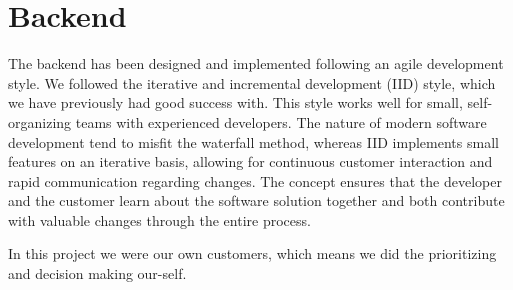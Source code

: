 \chapter{Backend}
\label{chap:backend}

The backend has been designed and implemented following an agile development style. We followed the iterative and incremental development (IID) style, which we have previously had good success with. This style works well for small, self-organizing teams with experienced developers. The nature of modern software development tend to misfit the waterfall method, whereas IID implements small features on an iterative basis, allowing for continuous customer interaction and rapid communication regarding changes. The concept ensures that the developer and the customer learn about the software solution together and both contribute with valuable changes through the entire process. 

In this project we were our own customers, which means we did the prioritizing and decision making our-self.



